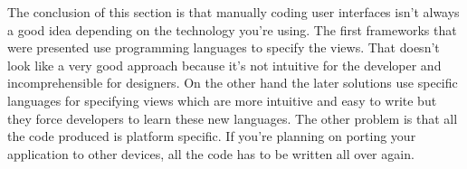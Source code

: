The conclusion of this section is that manually coding user interfaces isn't always a good idea depending on the technology you're using. The first frameworks that were presented use programming languages to specify the views. That doesn't look like a very good approach because it's not intuitive for the developer and incomprehensible for designers. On the other hand the later solutions use specific languages for specifying views which are more intuitive and easy to write but they force developers to learn these new languages. The other problem is that all the code produced is platform specific. If you're planning on porting your application to other devices, all the code has to be written all over again.
